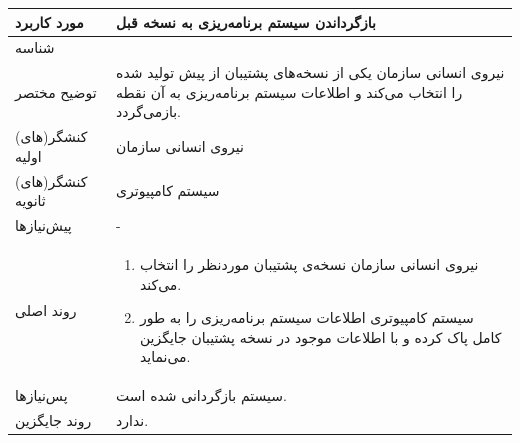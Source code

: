 \begin{table}[H]
	\centering
	\begin{tabular}{|p{3cm}|p{10cm}|}
		\hline
		مورد کاربرد & بازگرداندن سیستم برنامه‌ریزی به نسخه قبل  \\
		\hline
		شناسه & 
		\stepcounter{usecase_ID}
		\arabic{usecase_ID} \\
		\hline
		توضیح مختصر & نیروی انسانی سازمان یکی از نسخه‌های پشتیبان از پیش تولید شده را انتخاب می‌کند و اطلاعات سیستم برنامه‌ریزی به آن نقطه بازمی‌گردد. \\
		\hline
		کنشگر(های) اولیه & نیروی انسانی سازمان \\
		\hline
		کنشگر(های) ثانویه & سیستم کامپیوتری \\
		\hline
		پیش‌نیازها & - \\
		\hline
		
		روند اصلی &
		\begin{enumerate}[topsep=0cm,leftmargin=0.5cm]
			\item نیروی انسانی سازمان نسخه‌ی پشتیبان موردنظر را انتخاب می‌کند.
			\item سیستم کامپیوتری اطلاعات سیستم برنامه‌ریزی را به طور کامل پاک کرده و با اطلاعات موجود در نسخه پشتیبان جایگزین می‌نماید.
		\end{enumerate} \\
		
		\hline
		پس‌نیازها & سیستم بازگردانی شده است. \\
		\hline
		روند جایگزین & ندارد. \\
		\hline
	\end{tabular}
\end{table}
